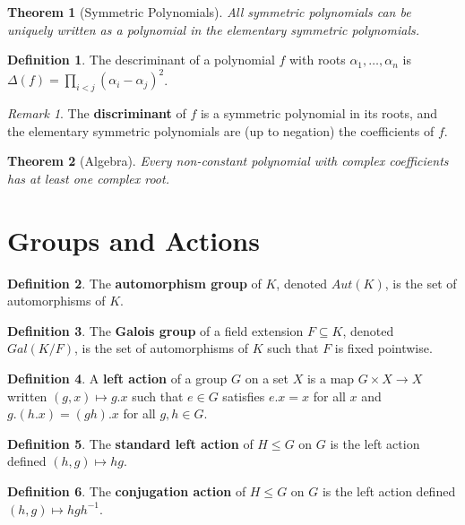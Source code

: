 \documentclass[
    parskip=half,
    toc=flat,
    toc=sectionentrydotfill,
]{scrartcl}  %
\theoremstyle{definition}
\newtheorem{definition}{Definition}[section]
\theoremstyle{plain}
\newtheorem{theorem}{Theorem}[section]
\theoremstyle{remark}
\newtheorem{remark}{Remark}[section]
\begin{document}
\begin{theorem}[Symmetric Polynomials]
    All symmetric polynomials can be uniquely written as a polynomial in the
    elementary symmetric polynomials.
\end{theorem}

\begin{definition}
    The descriminant of a polynomial $f$ with roots $\alpha_1,\dots,\alpha_n$
    is $\Delta(f)=\prod_{i<j}(\alpha_i-\alpha_j)^2$.
\end{definition}

\begin{remark}
    The \textbf{discriminant} of $f$ is a symmetric polynomial in its roots,
    and the elementary symmetric polynomials are (up to negation) the
    coefficients of $f$.
\end{remark}

\begin{theorem}[Algebra]
    Every non-constant polynomial with complex coefficients has at least one
    complex root.
\end{theorem}


\section{Groups and Actions}


\begin{definition}
    The \textbf{automorphism group} of $K$, denoted $Aut(K)$, is the set of
    automorphisms of $K$.
\end{definition}

\begin{definition}
    The \textbf{Galois group} of a field extension $F\subseteq K$, denoted
    $Gal(K/F)$, is the set of automorphisms of $K$ such that $F$ is fixed
    pointwise.
\end{definition}

\begin{definition}
    A \textbf{left action} of a group $G$ on a set $X$ is a map
    $G\times X\to X$ written $(g,x)\mapsto g.x$ such that $e\in G$ satisfies
    $e.x=x$ for all $x$ and $g.(h.x)=(gh).x$ for all $g,h\in G$.
\end{definition}

\begin{definition}
    The \textbf{standard left action} of $H\leq G$ on $G$ is the left action
    defined $(h,g)\mapsto hg$.
\end{definition}

\begin{definition}
    The \textbf{conjugation action} of $H\leq G$ on $G$ is the left action
    defined $(h,g)\mapsto hgh^{-1}$.
\end{definition}
\end{document}
